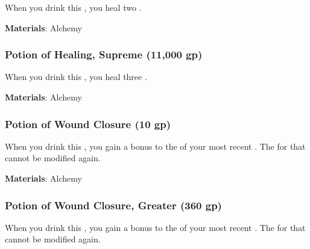 When you drink this , you heal two .



\vspace{0.25em}
\textbf{Materials}: Alchemy


\lowercase{\hypertarget{item:Potion of Healing, Supreme}{}}\label{item:Potion of Healing, Supreme}
\hypertarget{item:Potion of Healing, Supreme}{\subsubsection{Potion of Healing, Supreme\hfill{} (11,000  gp)}}

When you drink this , you heal three .



\vspace{0.25em}
\textbf{Materials}: Alchemy


\lowercase{\hypertarget{item:Potion of Wound Closure}{}}\label{item:Potion of Wound Closure}
\hypertarget{item:Potion of Wound Closure}{\subsubsection{Potion of Wound Closure\hfill{} (10 gp)}}

When you drink this , you gain a  bonus to the  of your most recent .
The  for that  cannot be modified again.



\vspace{0.25em}
\textbf{Materials}: Alchemy


\lowercase{\hypertarget{item:Potion of Wound Closure, Greater}{}}\label{item:Potion of Wound Closure, Greater}
\hypertarget{item:Potion of Wound Closure, Greater}{\subsubsection{Potion of Wound Closure, Greater\hfill{} (360 gp)}}

When you drink this , you gain a  bonus to the  of your most recent .
The  for that  cannot be modified again.



